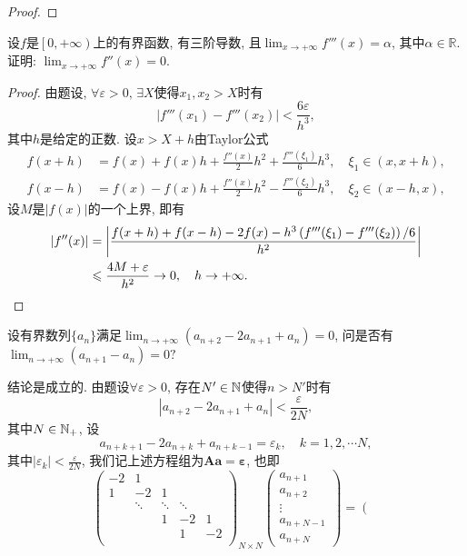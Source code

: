 \begin{quiza}
\begin{proof}
\end{proof}
\woe 设\(f\)是\(\left[0,+\infty\right)\)上的有界函数, 有三阶导数, 且\(\lim_{x\rightarrow+\infty}f'''(x)=\alpha\), 其中\(\alpha\in\mathbb{R}\). 证明: \(\lim_{x\rightarrow+\infty}f''(x)=0.\)
\begin{proof}
	由题设, \(\forall\varepsilon>0,\,\exists X\)使得\(x_1,x_2>X\)时有\[\left|f'''(x_1)-f'''(x_2)\right|<\frac{6\varepsilon}{h^3},\]其中\(h\)是给定的正数. 设\(x>X+h\)由Taylor公式\[\begin{split}
		f(x+h)&=f(x)+f(x)h+\frac{f''(x)}{2}h^2+\frac{f'''(\xi_1)}{6}h^3,\quad \xi_1\in(x,x+h),\\
		f(x-h)&=f(x)-f(x)h+\frac{f''(x)}{2}h^2-\frac{f'''(\xi_2)}{6}h^3,\quad \xi_2\in(x-h,x),
	\end{split}\]设\(M\)是\(|f(x)|\)的一个上界, 即有\[\begin{split}
	|f''(x)|&=\left|\frac{f(x+h)+f(x-h)-2f(x)-h^3\left(f'''(\xi_1)-f'''(\xi_2)\right)/6}{h^2}\right|\\&\leqslant\frac{4M+\varepsilon}{h^2}\rightarrow 0,\quad h\rightarrow+\infty.\qedhere
	\end{split}\]
\end{proof}
\woe 设有界数列\(\{a_n\}\)满足\(\lim_{n\rightarrow+\infty}\left(a_{n+2}-2a_{n+1}+a_n\right)=0\), 问是否有\(\lim_{n\rightarrow+\infty}\left(a_{n+1}-a_n\right)=0?\)
\begin{solution}
	结论是成立的. 由题设\(\forall\varepsilon>0\), 存在\(N'\in\mathbb{N}\)使得\(n>N'\)时有\[\left|a_{n+2}-2a_{n+1}+a_{n}\right|<\frac{\varepsilon}{2N},\]其中\(N\in\mathbb{N}_+\), 设\[
	a_{n+k+1}-2a_{n+k}+a_{n+k-1}=\varepsilon_{k},\quad k=1,2,\cdots N,\]其中\(|\varepsilon_{k}|<\frac{\varepsilon}{2N}\), 我们记上述方程组为\(\boldsymbol{A}\boldsymbol{a}=\boldsymbol{\varepsilon}\), 也即\[\left(\begin{matrix}
	-2&	1&	&	&	\\
	 1&	-2&	1&	&	\\
	  &	\ddots&	\ddots&	\ddots&	\\
		&&1&-2&1\\
		&&&1&	-2\\
	\end{matrix}\right)_{N\times N}\left(\begin{matrix}
	a_{n+1}\\
	a_{n+2}\\
	\vdots\\
	a_{n+N-1}\\
	a_{n+N}
	\end{matrix}\right)=\left(\begin{matrix}

\end{matrix}\]
\end{solution}
\end{quiza}
